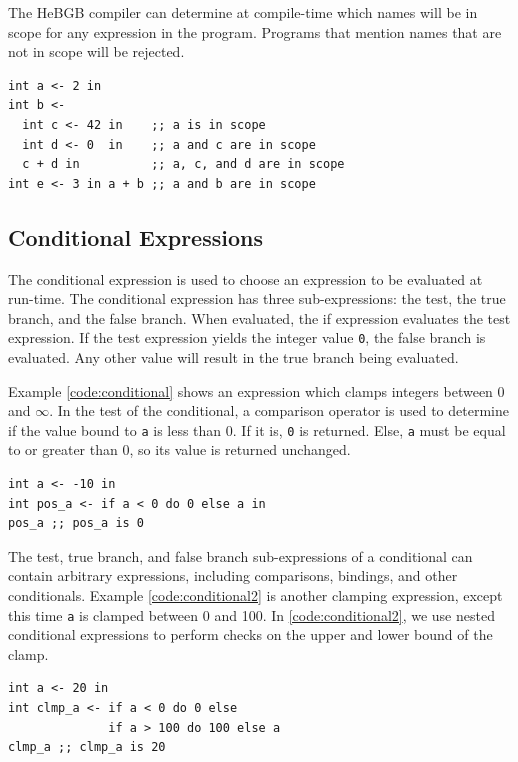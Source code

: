 \documentclass[12pt]{article}
\begin{document}
The HeBGB compiler can determine at compile-time which names will
be in scope for any expression in the program. Programs that mention
names that are not in scope will be rejected.
\begin{code_box}
\label{code:scope}
\begin{lstlisting}[language=HeBGB]
int a <- 2 in
int b <- 
  int c <- 42 in    ;; a is in scope
  int d <- 0  in    ;; a and c are in scope
  c + d in          ;; a, c, and d are in scope
int e <- 3 in a + b ;; a and b are in scope
\end{lstlisting}
\end{code_box}
\subsection{Conditional Expressions}
The conditional expression is used to choose an expression to be
evaluated at run-time. The conditional expression has three sub-expressions:
the test, the true branch, and the false branch. When evaluated, the
if expression evaluates the test expression. If the test expression yields
the integer value \texttt{0}, the false branch is evaluated. Any other
value will result in the true branch being evaluated.

Example \ref{code:conditional} shows an expression which clamps
integers between 0 and $\infty$. In the test of the conditional,
a comparison operator is used to determine if the value bound to
\texttt{a} is less than 0. If it is, \texttt{0} is returned. Else,
\texttt{a} must be equal to or greater than 0, so its value is
returned unchanged.
\begin{code_box}
\label{code:conditional}
\begin{lstlisting}[language=HeBGB]
int a <- -10 in
int pos_a <- if a < 0 do 0 else a in
pos_a ;; pos_a is 0
\end{lstlisting}
\end{code_box}
The test, true branch, and false branch sub-expressions of a conditional
can contain arbitrary expressions, including comparisons, bindings, and
other conditionals. Example \ref{code:conditional2} is another 
clamping expression, except this time \texttt{a} is clamped between 
0 and 100. In \ref{code:conditional2}, we use nested conditional expressions
to perform checks on the upper and lower bound of the clamp. 

\begin{code_box}
\label{code:conditional2}
\begin{lstlisting}[language=HeBGB]
int a <- 20 in
int clmp_a <- if a < 0 do 0 else
              if a > 100 do 100 else a
clmp_a ;; clmp_a is 20
\end{lstlisting}
\end{code_box}
\end{document}
